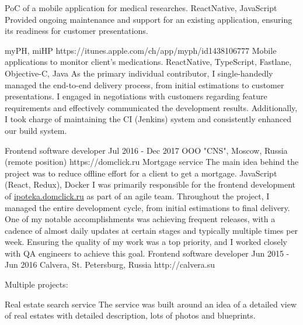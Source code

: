 \documentclass[11pt,a4paper,sans]{awesomecv}
\begin{document}
\begin{cventries}
{\begin{cvprojects}{0.8ex}
          {PoC of a mobile application for medical researches.}
          {}{}
          {ReactNative, JavaScript}
          {Provided ongoing maintenance and support for an existing application, ensuring its readiness for customer presentations.}
      \item \cvproject
          {myPH, miHP}
          {https://itunes.apple.com/ch/app/myph/id1438106777}
          {Mobile applications to monitor client's medications.}
          {ReactNative, TypeScript, Fastlane, Objective-C, Java}
          {
            As the primary individual contributor, 
            I single-handedly managed the end-to-end delivery process, 
            from initial estimations to customer presentations. 
            I engaged in negotiations with customers regarding feature 
            requirements and effectively communicated the development results. 
            Additionally, I took charge of maintaining the CI (Jenkins) system 
            and consistently enhanced our build system.
          }
      \end{cvprojects}
    }
\cventry
    {Frontend software developer}
    {Jul 2016 - Dec 2017}
    {OOO "CNS", Moscow, Russia (remote position)}
    {https://domclick.ru}
    {
      \cvproject
          {Mortgage service}
          {}
          {The main idea behind the project was to reduce offline effort for a client to get a mortgage.}
          {JavaScript (React, Redux), Docker}
          {
            I was primarily responsible for the frontend development 
            of \href{http://ipoteka.domclick.ru}{ipoteka.domclick.ru} 
            as part of an agile team. Throughout the project, 
            I managed the entire development cycle, from initial estimations 
            to final delivery. One of my notable accomplishments was achieving 
            frequent releases, with a cadence of almost daily updates at 
            certain stages and typically multiple times per week. 
            Ensuring the quality of my work was a top priority, and I worked 
            closely with QA engineers to achieve this goal.
            \hfill \break
          }
    }
\cventry
    {Frontend software developer}
    {Jun 2015 - Jun 2016}
    {Calvera, St. Petersburg, Russia}
    {http://calvera.su}
    {
      Multiple projects:\newline
      \begin{cvprojects}{0.8ex}
        \item \cvproject
            {Real estate search service}
            {}
            {The service was built around an idea of a detailed view of real estates with detailed description, lots of photos and blueprints.}

\end{cvprojects}}
\end{cventries}
\end{document}
